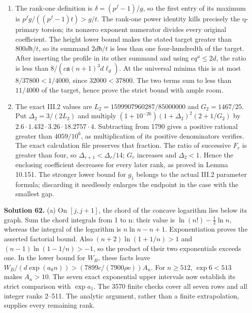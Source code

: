 \documentclass[
  11pt,
  a4paper,
]{article}
\begin{document}
\begin{enumerate}
\def\labelenumi{(\alph{enumi})}
\setcounter{enumi}{1}
\item
  The rank-one definition is \(\delta=(p^f-1)/g\), so the first entry of
  its maximum is \(p^fg/((p^f-1)t)>g/t\). The rank-one power identity
  kills precisely the q-primary torsion; its nonzero exponent numerator
  divides every original coefficient. The height lower bound makes the
  stated target greater than \(800d\mathsf h/t\), so its summand
  \(2d\mathsf h/t\) is less than one four-hundredth of the target. After
  inserting the profile in its other summand and using \(eq^u\le2d\),
  the ratio is less than \(8/(c\mathfrak a(n+1)^3d\ell_d)\). At the
  universal minima this is at most \(8/37800<1/4000\), since
  \(32000<37800\). The two terms sum to less than \(11/4000\) of the
  target, hence prove the strict bound with ample room.
\item
  The exact III.2 values are \(L_2=1599907960287/85000000\) and
  \(G_2=1467/25\). Put \(\Delta_2=3/(2L_2)\) and multiply
  \((1+10^{-26})(1+\Delta_2)^2(2+1/G_2)\) by
  \(2.6\cdot1.432\cdot3.26\cdot18.2757\cdot4\). Subtracting from 1790
  gives a positive rational greater than \(4059/10^6\), as
  multiplication of its positive denominators verifies. The exact
  calculation file preserves that fraction. The ratio of successive
  \(F_r\) is greater than four, so \(\Delta_{r+1}<\Delta_r/14\); \(G_r\)
  increases and \(\Delta_2<1\). Hence the enclosing coefficient
  decreases for every later rank, as proved in Lemma 10.151. The
  stronger lower bound for \(g_1\) belongs to the actual III.2 parameter
  formula; discarding it needlessly enlarges the endpoint in the case
  with the smallest gap.
\end{enumerate}

\textbf{Solution 62.} (a) On \([j,j+1]\), the chord of the concave
logarithm lies below its graph. Sum the chord integrals from 1 to n:
their value is \(\ln(n!)-\tfrac12\ln n\), whereas the integral of the
logarithm is \(n\ln n-n+1\). Exponentiation proves the asserted
factorial bound. Also \((n+2)\ln(1+1/n)>1\) and \((n-1)\ln(1-1/n)>-1\),
so the product of their two exponentials exceeds one. In the lower bound
for \(W_B\), these facts leave
\(W_B/(d\exp(a_0n))>(7899c/(7900\rho\mathrm e))A_n\). For \(n\ge512\),
\(\exp6<513\) makes \(A_n>10\). The seven exact exponential upper
intervals now establish its strict comparison with \(\exp a_1\). The
3570 finite checks cover all seven rows and all integer ranks 2--511.
The analytic argument, rather than a finite extrapolation, supplies
every remaining rank.
\end{document}
